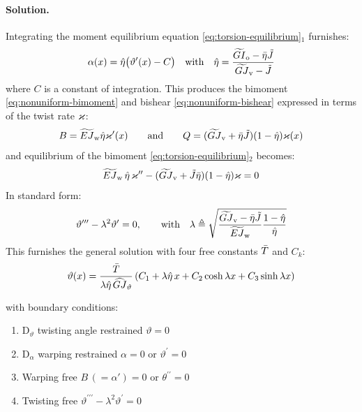 \paragraph{Solution.}
Integrating the moment equilibrium equation \eqref{eq:torsion-equilibrium}$_1$ furnishes:
\begin{equation*}
    \alpha (x)= \hat{\eta }\bigl(
     \vartheta^{\prime}(x) - C\bigr)
     \quad\text{with}\quad 
     \hat{\eta} = \frac{\widetilde{GI}_{\mathrm{o}} - \bar{\eta}\tilde{J}}{\widetilde{GJ}_{\mathrm{v}} - \tilde{J}}
\end{equation*}
where \(C\) is a constant of integration. 
This produces the bimoment \eqref{eq:nonuniform-bimoment} and bishear \eqref{eq:nonuniform-bishear} expressed in terms of the twist rate \(\varkappa\):
\begin{equation*}
B = \widetilde{EJ}_{\mathrm{w}} \hat{\eta} \varkappa'(x) 
\qquad\text{and}\qquad
Q = (\widetilde{GJ}_{\mathrm{v}} + \bar{\eta}\tilde{J})(1 - \hat{\eta}) \varkappa(x)
\end{equation*}
and equilibrium of the bimoment \eqref{eq:torsion-equilibrium}$_2$ becomes:
\begin{equation}
\widetilde{EJ}_{\mathrm{w}}\, \hat{\eta}\, \varkappa'' - (\widetilde{GJ}_{\mathrm{v}} + \tilde{J}\bar{\eta})(1 - \hat{\eta}) \varkappa = 0
\end{equation}
%
In standard form:
\begin{equation*}
\vartheta''' - \lambda^2 \vartheta' = 0,
\qquad\text{with}\quad
\lambda \triangleq \sqrt{\frac{\widetilde{GJ}_{\mathrm{v}} - \bar{\eta}\tilde{J}}{\widetilde{EJ}_{\mathrm{w}}}\frac{1 - \hat{\eta}}{\hat{\eta}}}
\end{equation*}
%
This furnishes the general solution with four free constants \(\bar{T}\) and \(C_k\):
\begin{equation}
\begin{aligned}
\vartheta(x)= \frac{\bar{T}}{\lambda \hat{\eta} \, \widehat{GJ}_{\vartheta}}\left(
 C_1 + \lambda\hat{\eta} \, x +  C_2 \cosh \lambda x + C_3 \sinh \lambda x
\right)
\end{aligned}
\label{eq:0028-gen-rot}
\end{equation}

with boundary conditions:

\begin{enumerate}
\item $\mathrm{D}_{\vartheta}$ twisting angle restrained $\vartheta=0$
\item $\mathrm{D}_{\alpha}$ warping restrained $\alpha=0$ or $\vartheta^{\prime}=0$
\item Warping free $B \,(= \alpha') =0$ or $\theta^{\prime \prime}=0$
\item Twisting free $\vartheta^{\prime \prime \prime}-\lambda^2 \vartheta^{\prime}=0$ %
\end{enumerate}
\fi

